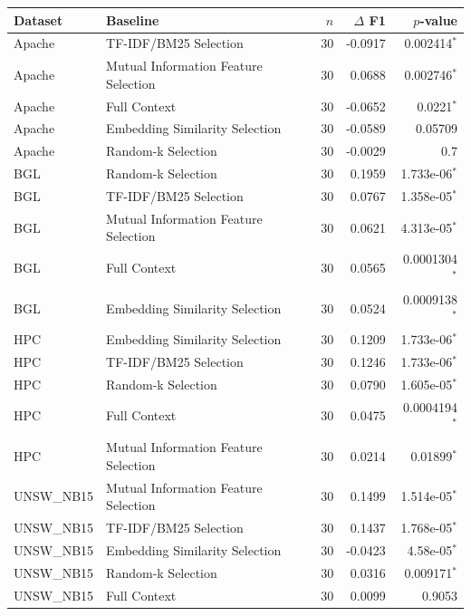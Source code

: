 \begin{tabular}{llrrr}
\toprule
Dataset & Baseline & $n$ & $\Delta$ F1 & $p$-value \\
\midrule
Apache & TF-IDF/BM25 Selection & 30 & -0.0917 & 0.002414$^*$ \\
Apache & Mutual Information Feature Selection & 30 & 0.0688 & 0.002746$^*$ \\
Apache & Full Context & 30 & -0.0652 & 0.0221$^*$ \\
Apache & Embedding Similarity Selection & 30 & -0.0589 & 0.05709 \\
Apache & Random-k Selection & 30 & -0.0029 & 0.7 \\
BGL & Random-k Selection & 30 & 0.1959 & 1.733e-06$^*$ \\
BGL & TF-IDF/BM25 Selection & 30 & 0.0767 & 1.358e-05$^*$ \\
BGL & Mutual Information Feature Selection & 30 & 0.0621 & 4.313e-05$^*$ \\
BGL & Full Context & 30 & 0.0565 & 0.0001304$^*$ \\
BGL & Embedding Similarity Selection & 30 & 0.0524 & 0.0009138$^*$ \\
HPC & Embedding Similarity Selection & 30 & 0.1209 & 1.733e-06$^*$ \\
HPC & TF-IDF/BM25 Selection & 30 & 0.1246 & 1.733e-06$^*$ \\
HPC & Random-k Selection & 30 & 0.0790 & 1.605e-05$^*$ \\
HPC & Full Context & 30 & 0.0475 & 0.0004194$^*$ \\
HPC & Mutual Information Feature Selection & 30 & 0.0214 & 0.01899$^*$ \\
UNSW_NB15 & Mutual Information Feature Selection & 30 & 0.1499 & 1.514e-05$^*$ \\
UNSW_NB15 & TF-IDF/BM25 Selection & 30 & 0.1437 & 1.768e-05$^*$ \\
UNSW_NB15 & Embedding Similarity Selection & 30 & -0.0423 & 4.58e-05$^*$ \\
UNSW_NB15 & Random-k Selection & 30 & 0.0316 & 0.009171$^*$ \\
UNSW_NB15 & Full Context & 30 & 0.0099 & 0.9053 \\
\bottomrule
\end{tabular}
